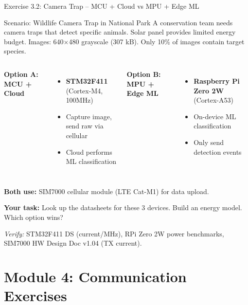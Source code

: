 \documentclass[aspectratio=169,11pt]{beamer}
\begin{document}
\begin{frame}{Exercise 3.2: Camera Trap -- MCU + Cloud vs MPU + Edge ML}
    \begin{block}{Scenario: Wildlife Camera Trap in National Park}
        A conservation team needs camera traps that detect specific animals. Solar panel provides limited energy budget. Images: 640$\times$480 grayscale (307 kB). Only 10\% of images contain target species.
        
        \vspace{0.2cm}
        \begin{columns}
            \textbf{Option A: MCU + Cloud}
            \begin{itemize}
                \item \textbf{STM32F411} (Cortex-M4, 100MHz)
                \item Capture image, send raw via cellular
                \item Cloud performs ML classification
            \end{itemize}
            
            \textbf{Option B: MPU + Edge ML}
            \begin{itemize}
                \item \textbf{Raspberry Pi Zero 2W} (Cortex-A53)
                \item On-device ML classification
                \item Only send detection events
            \end{itemize}
        \end{columns}
        
        \vspace{0.2cm}
        \textbf{Both use:} SIM7000 cellular module (LTE Cat-M1) for data upload.
    \end{block}
    
    \textbf{Your task:} Look up the datasheets for these 3 devices. Build an energy model. Which option wins?
    
    {\footnotesize \textit{Verify:} STM32F411 DS (current/MHz), RPi Zero 2W power benchmarks, SIM7000 HW Design Doc v1.04 (TX current).}
\end{frame}

\section{Module 4: Communication Exercises}
\end{document}

